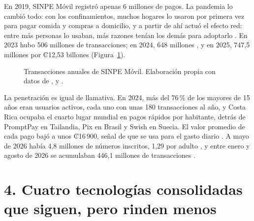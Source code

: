 \documentclass[11pt,letterpaper]{article}
\begin{document}
En 2019, SINPE Móvil registró apenas 6 millones de pagos. La pandemia lo cambió
todo: con los confinamientos, muchos hogares lo usaron por primera vez para
pagar comida y compras a domicilio, y a partir de ahí actuó el efecto red: entre
más personas lo usaban, más razones tenían los demás para adoptarlo
\parencite{araujo2024}. En 2023 hubo 506 millones de transacciones; en 2024,
648 millones \parencite{bccr2025usuarios}, y en 2025, 747,5 millones por
₡12,53 billones \parencite{rivero2026} (Figura~\ref{fig:anual}).

\begin{figure}[H]
\centering
{}
\caption{Transacciones anuales de SINPE Móvil. Elaboración propia con datos de
\Textcite{araujo2024}, \Textcite{bccr2025usuarios} y \Textcite{rivero2026}.}
\label{fig:anual}
\end{figure}

La penetración es igual de llamativa. En 2024, más del 76\,\% de los mayores de
15 años eran usuarios activos, cada uno con unas 180 transacciones al año, y
Costa Rica ocupaba el cuarto lugar mundial en pagos rápidos por habitante,
detrás de PromptPay en Tailandia, Pix en Brasil y Swish en Suecia. El valor
promedio de cada pago bajó a unos ₡16\,900, señal de que se usa para el gasto
diario \parencite{araujo2024}. A mayo de 2026 había 4,8 millones de números
inscritos, 1,29 por adulto \parencite{ramirez2026}, y entre enero y agosto de
2026 se acumulaban 446,1 millones de transacciones \parencite{arias2026}.

\section*{4. Cuatro tecnologías consolidadas que siguen, pero rinden menos}
\end{document}
